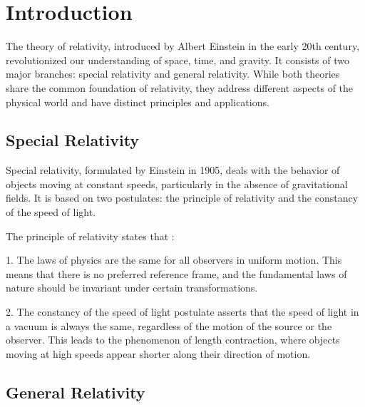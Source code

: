 \section{Introduction}
The theory of relativity, introduced by Albert Einstein in the early 20th century, revolutionized our understanding of space, time, and gravity. It consists of two major branches: special relativity and general relativity. While both theories share the common foundation of relativity, they address different aspects of the physical world and have distinct principles and applications.


\subsection{Special Relativity}
Special relativity, formulated by Einstein in 1905, deals with the behavior of objects moving at constant speeds, particularly in the absence of gravitational fields. It is based on two postulates: the principle of relativity and the constancy of the speed of light.\par
\begin{enrichment*}{}
    The principle of relativity states that : \par
    1. The laws of physics are the same for all observers in uniform motion. This means that there is no preferred reference frame, and the fundamental laws of nature should be invariant under certain transformations.\par    
    2. The constancy of the speed of light postulate asserts that the speed of light in a vacuum is always the same, regardless of the motion of the source or the observer. This leads to the phenomenon of length contraction, where objects moving at high speeds appear shorter along their direction of motion.\par
\end{enrichment*}


\subsection{General Relativity}

